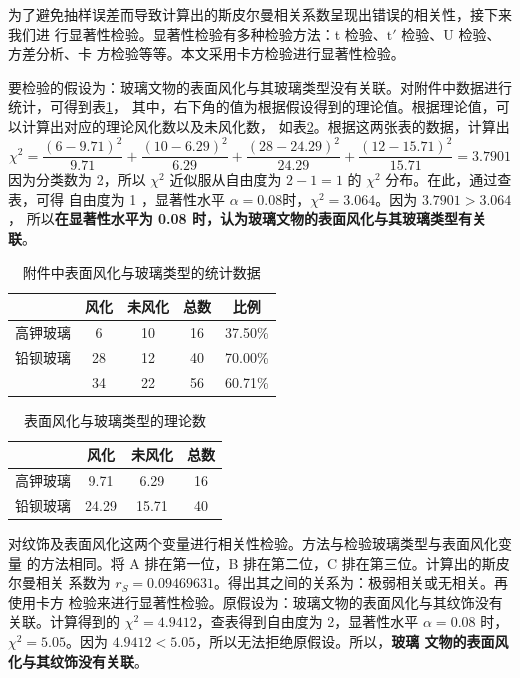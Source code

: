 \documentclass[withoutpreface,bwprint]{cumcmthesis} %
\begin{document}
为了避免抽样误差而导致计算出的斯皮尔曼相关系数呈现出错误的相关性，接下来我们进
行显著性检验。显著性检验有多种检验方法：t 检验、$\mathrm{t}'$ 检验、U 检验、方差分析、卡
方检验等等。本文采用卡方检验进行显著性检验。

要检验的假设为：玻璃文物的表面风化与其玻璃类型没有关联。对附件中数据进行统计，可得到表\ref{tab:type}，
其中，右下角的值为根据假设得到的理论值。根据理论值，可以计算出对应的理论风化数以及未风化数，
如表\ref{tab:theoreticalType}。根据这两张表的数据，计算出
\[
    \chi^2=\frac{(6-9.71)^2}{9.71}+\frac{(10-6.29)^2}{6.29}+
    \frac{(28-24.29)^2}{24.29}+\frac{(12-15.71)^2}{15.71}=3.7901
\]
因为分类数为 2，所以 $\chi^2$ 近似服从自由度为 $2-1=1$ 的 $\chi^2$ 分布。在此，通过查表，可得
自由度为 1 ，显著性水平 $\alpha=0.08$时，$\chi^2=3.064$。因为 $3.7901>3.064$，
所以\textbf{在显著性水平为 0.08 时，认为玻璃文物的表面风化与其玻璃类型有关联}。
\begin{table}[!htb]
    \centering
    \begin{tabular}{|c|c|c|c|c|}
        \hline
             & 风化 & 未风化 & 总数 & 比例\footnotemark \\
        \hline
        高钾玻璃 & 6  & 10  & 16 & 37.50\%         \\
        \hline
        铅钡玻璃 & 28 & 12  & 40 & 70.00\%         \\
        \hline
             & 34 & 22  & 56 & 60.71\%         \\
        \hline
    \end{tabular}
    \caption{附件中表面风化与玻璃类型的统计数据}
    \label{tab:type}
\end{table}
\begin{table}[!htb]
    \centering
    \begin{tabular}{|c|c|c|c|}
        \hline
             & 风化    & 未风化   & 总数 \\
        \hline
        高钾玻璃 & 9.71  & 6.29  & 16 \\
        \hline
        铅钡玻璃 & 24.29 & 15.71 & 40 \\
        \hline
    \end{tabular}
    \caption{表面风化与玻璃类型的理论数}
    \label{tab:theoreticalType}
\end{table}

对纹饰及表面风化这两个变量进行相关性检验。方法与检验玻璃类型与表面风化变量
的方法相同。将 A 排在第一位，B 排在第二位，C 排在第三位。计算出的斯皮尔曼相关
系数为 $r_S = 0.09469631$。得出其之间的关系为：极弱相关或无相关。再使用卡方
检验来进行显著性检验。原假设为：玻璃文物的表面风化与其纹饰没有关联。计算得到的
$\chi^2=4.9412$，查表得到自由度为 2，显著性水平 $\alpha=0.08$ 时，
$\chi^2=5.05$。因为 $4.9412<5.05$，所以无法拒绝原假设。所以，\textbf{玻璃
    文物的表面风化与其纹饰没有关联}。
\end{document}
